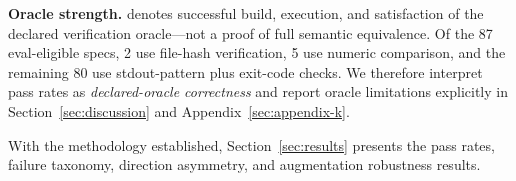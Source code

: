 \textbf{Oracle strength.} 
\pass{} denotes successful build, execution, and satisfaction of the declared verification oracle---not a proof of full semantic equivalence. Of the 87 eval-eligible specs, 2 use file-hash verification, 5 use numeric comparison, and the remaining 80 use stdout-pattern plus exit-code checks. We therefore interpret pass rates as \emph{declared-oracle correctness} and report oracle limitations explicitly in Section~\ref{sec:discussion} and Appendix~\ref{sec:appendix-k}.

With the methodology established, Section~\ref{sec:results} presents the pass rates, failure taxonomy, direction asymmetry, and augmentation robustness results.